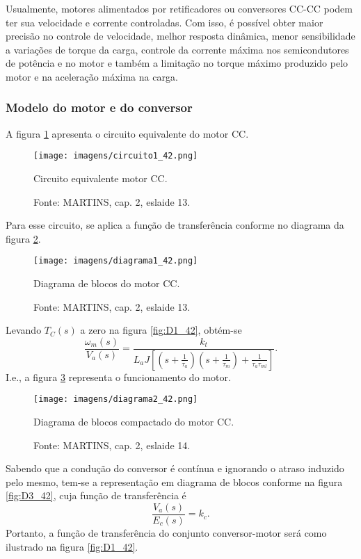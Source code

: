 Usualmente, motores alimentados por retificadores ou conversores CC-CC podem ter sua velocidade e corrente controladas. Com isso, é possível obter maior precisão no controle de velocidade, melhor resposta dinâmica, menor sensibilidade a variações de torque da carga, controle da corrente máxima nos semicondutores de potência e no motor e também a limitação no torque máximo produzido pelo motor e na aceleração máxima na carga.

\subsubsection{Modelo do motor e do conversor}

A figura \ref{fig:C1_42} apresenta o circuito equivalente do motor CC.

\begin{figure}[ht!]
\center
\texttt{[image: imagens/circuito1\_42.png]}
\caption{\label{fig:C1_42}Circuito equivalente motor CC.}
\caption*{Fonte: MARTINS, cap. 2, eslaide 13.}
\end{figure}

Para esse circuito, se aplica a função de transferência conforme no diagrama da figura \ref{fig:DBMCC}.

\begin{figure}[ht!]
\center
\texttt{[image: imagens/diagrama1\_42.png]}
\caption{\label{fig:DBMCC}Diagrama de blocos do motor CC.}
\caption*{Fonte: MARTINS, cap. 2, eslaide 13.}
\end{figure}

Levando $T_{C}(s)$ a zero na figura \ref{fig:D1_42}, obtém-se 
\[\frac{\omega_{m}(s)}{V_{a}(s)} =  \frac{k_{t}}{L_{a}J\left[\left(s + \frac{1}{\tau_{a}}\right)\left(s + \frac{1}{\tau_{m}}\right) + \frac{1}{\tau_{a}\tau_{ml}}\right] }.\]
I.e., a figura \ref{fig:D2_42} representa o funcionamento do motor.

\begin{figure}[ht!]
\center
\texttt{[image: imagens/diagrama2\_42.png]}
\caption{\label{fig:D2_42}Diagrama de blocos compactado do motor CC.}
\caption*{Fonte: MARTINS, cap. 2, eslaide 14.}
\end{figure}

Sabendo que a condução do conversor é contínua e ignorando o atraso induzido pelo mesmo, tem-se a representação em diagrama de blocos conforme na figura \ref{fig:D3_42}, cuja função de transferência é 
\[\frac{V_{a}(s)}{E_{c}(s)} = k_{c}.\]
Portanto, a função de transferência do conjunto conversor-motor será como ilustrado na figura \ref{fig:D1_42}.

